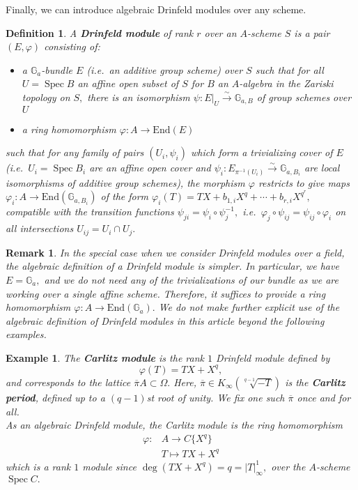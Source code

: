\documentclass[11pt]{amsart}
\newtheorem{definition}[theorem]{Definition}
\newtheorem{example}[theorem]{Example}
\newtheorem{remark}[theorem]{Remark}
\theoremstyle{definition}
\numberwithin{equation}{section}
\newcommand{\End}{\mathrm{End}} 	%
\newcommand{\Spec}{\operatorname{Spec}} 	%
\newcommand{\bbG}{\mathbb{G}}		%
\begin{document}
		Finally, we can introduce algebraic Drinfeld modules over any scheme.
		\begin{definition}
			A \textbf{Drinfeld module} of rank $r$ over an $A$-scheme $S$ is a pair
			$(E,\varphi)$ consisting of:
			\begin{itemize}
				\item a $\bbG_a$-bundle $E$ (i.e.\ an additive group scheme) over $S$ such that for all $U=\Spec B$ an affine open subset of $S$ for $B$ an $A$-algebra in the Zariski topology on $S,$ there is an isomorphism $\psi: E|_U\overset{\sim}{\to} \bbG_{a,B}$ of group schemes over $U$
				\item a ring homomorphism $\varphi: A\to \End(E)$
			\end{itemize}
			such that for any family of pairs $(U_i,\psi_i)$ which form a trivializing cover of $E$ (i.e.\ $U_i=\Spec B_i$ are an affine open cover and $\psi_i:E_{\pi^{-1}(U_i)}\overset{\sim}{\to}\bbG_{a,B_i}$ are local isomorphisms of additive group schemes), the morphism $\varphi$ restricts to give maps $\varphi_i:A\to \End(\bbG_{a,B_i})$ of the form $\varphi_i(T)=TX+b_{1,i}X^q+\cdots+b_{r,i}X^{q^r},$ compatible with the transition functions $\psi_{ji}=\psi_i\circ \psi_j^{-1},$ i.e.\ $\varphi_j\circ \psi_{ij}=\psi_{ij}\circ \varphi_i$ on all intersections $U_{ij}=U_i\cap U_j.$
		\end{definition}
		
		\begin{remark}
			In the special case when we consider Drinfeld modules over a field, the algebraic definition of a Drinfeld module is simpler. In particular, we have $E=\bbG_a,$ and we do not need any of the trivializations of our bundle as we are working over a single affine scheme. Therefore, it suffices to provide a ring homomorphism $\varphi: A\to \End(\bbG_a).$ We do not make further explicit use of the algebraic definition of Drinfeld modules in this article beyond the following examples.
		\end{remark}
		
		\begin{example}\cite{Carlitz-class-of-poly}\label{ex: Carlitz module}
			The \textbf{Carlitz module} is the rank $1$ Drinfeld module defined by \[\varphi(T)=TX+X^q,\] and corresponds to the lattice $\overline{\pi}A\subset \Omega.$ Here, $\overline{\pi}\in K_{\infty}(\sqrt[q-1]{-T})$ is the \textbf{Carlitz period}, defined up to a $(q-1)$st root of unity. We fix one such $\overline{\pi}$ once and for all.\\
			
			As an algebraic Drinfeld module, the Carlitz module is the ring homomorphism 
			\begin{align*}
				\varphi: &A\to C\{X^q\}\\
				&T\mapsto TX+X^q 
			\end{align*}
			which is a rank $1$ module since $\deg (TX+X^q)=q=|T|_{\infty}^1,$ over the $A$-scheme $\Spec C.$ 
		\end{example}
		
\end{document}
